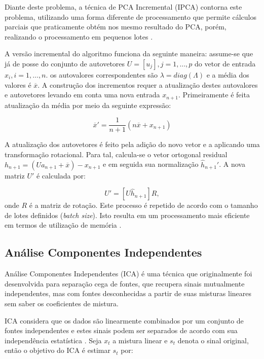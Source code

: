 Diante deste problema, a técnica de PCA Incremental (IPCA) contorna este problema, utilizando uma forma diferente de processamento  que permite cálculos parciais que praticamente obtém nos mesmo resultado do PCA, porém, realizando o processamento em pequenos lotes \cite{Weng2003}.

A versão incremental do algoritmo funciona da seguinte maneira: assume-se que já de posse do conjunto de autovetores $U = [u_j], j = 1,\ldots, p$ do vetor de entrada $x_i, i = 1,\ldots,n$. os autovalores correspondentes são $\lambda = diag(\Lambda)$ e a média dos valores é $\overline{x}$. A construção dos incrementos requer a atualização destes autovalores e autovetores levando em conta uma nova entrada $x_{n+1}$. Primeiramente é feita atualização da média por meio da seguinte expressão\cite{Artac2002}:

\begin{equation}\label{eq:ipca1}
\overline{x}' = \frac{1}{n+1}(n\overline{x} + x_{n+1})
\end{equation}

A atualização dos autovetores é feito pela adição do novo vetor e a aplicando uma transformação rotacional. Para tal, calcula-se o vetor ortogonal residual $h_{n+1} = (Ua_{n+1} + \overline{x})-x_{n+1}$ e em seguida sua normalização $\hat{h}_{n+1}'$. A nova matriz $U'$ é calculada por:

\begin{equation}\label{eq:ipca1}
U' = [U \hat{h}_{n+1}] R,
\end{equation}
\noindent onde $R$ é a matriz de rotação. Este processo é repetido de acordo com o tamanho de lotes definidos (\textit{batch size}). Isto resulta em um processamento mais eficiente em termos de utilização de memória \cite{NIPS2013_5132}.

\subsection{Análise Componentes Independentes}

Análise Componentes Independentes (ICA) \cite{lee1998independent} é uma técnica que originalmente foi desenvolvida para separação cega de fontes, que recupera sinais mutualmente independentes, mas com fontes desconhecidas a partir de suas misturas lineares sem saber os coeficientes de mistura.

ICA considera que os dados são linearmente combinados por um conjunto de fontes independentes e estes sinais podem ser separados de acordo com sua independência estatística \cite{wang2006independent}. Seja $x_t$ a mistura linear e $s_t$ denota o sinal original, então o objetivo do ICA é estimar $s_t$ por:


